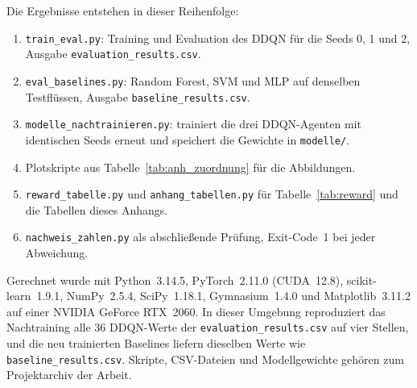 Die Ergebnisse entstehen in dieser Reihenfolge:
\begin{enumerate}\raggedright
	\item \texttt{train\_\allowbreak eval.py}: Training und Evaluation des DDQN für die Seeds 0, 1 und 2, Ausgabe \texttt{evaluation\_\allowbreak results.csv}.
	\item \texttt{eval\_\allowbreak baselines.py}: Random Forest, SVM und MLP auf denselben Testflüssen, Ausgabe \texttt{baseline\_\allowbreak results.csv}.
	\item \texttt{modelle\_\allowbreak nachtrainieren.py}: trainiert die drei DDQN-Agenten mit identischen Seeds erneut und speichert die Gewichte in \texttt{modelle/}.
	\item Plotskripte aus Tabelle~\ref{tab:anh_zuordnung} für die Abbildungen.
	\item \texttt{reward\_\allowbreak tabelle.py} und \texttt{anhang\_\allowbreak tabellen.py} für Tabelle~\ref{tab:reward} und die Tabellen dieses Anhangs.
	\item \texttt{nachweis\_\allowbreak zahlen.py} als abschließende Prüfung, Exit-Code~1 bei jeder Abweichung.
\end{enumerate}

Gerechnet wurde mit Python~3.14.5, PyTorch~2.11.0 (CUDA~12.8), scikit-learn~1.9.1, NumPy~2.5.4, SciPy~1.18.1, Gymnasium~1.4.0 und Matplotlib~3.11.2 auf einer NVIDIA GeForce RTX~2060. In dieser Umgebung reproduziert das Nachtraining alle 36 DDQN-Werte der \texttt{evaluation\_\allowbreak results.csv} auf vier Stellen, und die neu trainierten Baselines liefern dieselben Werte wie \texttt{baseline\_\allowbreak results.csv}. Skripte, CSV-Dateien und Modellgewichte gehören zum Projektarchiv der Arbeit.
